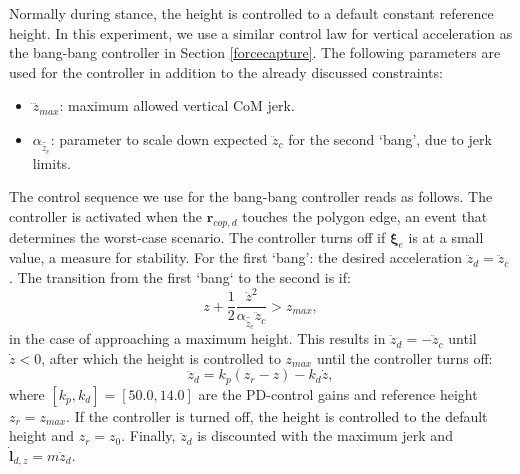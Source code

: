 \documentclass[letterpaper, 10 pt, conference]{ieeeconf}  %
\newcommand{\zmax}{z_{max}}
\newcommand{\rcmpd}{\mathbf{r}_{cop,d}}
\newcommand{\icpe}{\boldsymbol{\xi}_e}
\begin{document}
Normally during stance, the height is controlled to a default constant reference height. In this experiment, we use a similar control law for vertical acceleration as the bang-bang controller in Section \ref{forcecapture}. The following parameters are used for the controller in addition to the already discussed constraints:
\begin{itemize}
	\item $\dddot{z}_{max}$: maximum allowed vertical CoM jerk.
	\item $\alpha_{\hat{\ddot{z}}_{c}}$: parameter to scale down expected $\ddot{z}_c$ for the second `bang', due to jerk limits.
\end{itemize}

The control sequence we use for the bang-bang controller reads as follows. The controller is activated when the $\rcmpd$ touches the polygon edge, an event that determines the worst-case scenario. The controller turns off if $\icpe$ is at a small value, a measure for stability. For the first `bang': the desired acceleration $\ddot{z}_d=\ddot{z}_c$. The transition from the first `bang` to the second is if:
\begin{equation}
	z+\frac{1}{2}\frac{\dot{z}^2}{\alpha_{\hat{\ddot{z}}_{c}}\ddot{z}_{c}} >\zmax,
\end{equation}
in the case of approaching a maximum height. This results in $\ddot{z}_d=-\ddot{z}_c$ until $\dot{z}<0$, after which the height is controlled to $\zmax$ until the controller turns off:
\begin{equation}
	\ddot{z}_d = k_p(z_r-z)-k_d\dot{z},
\end{equation}
where $[k_p,k_d]=[50.0,14.0]$ are the PD-control gains and reference height $z_r= \zmax$. If the controller is turned off, the height is controlled to the default height and $z_r=z_0$. Finally, $\ddot{z}_d$ is discounted with the maximum jerk and $\dot{\mathbf{l}}_{d,z}=m\ddot{z}_d$.
\end{document}
